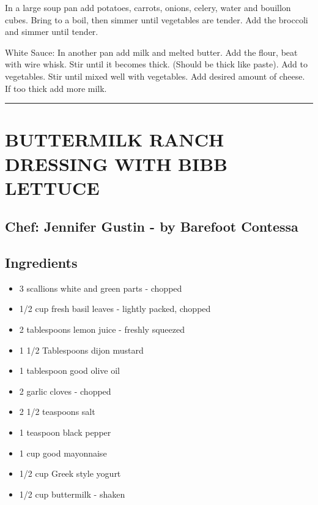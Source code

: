 \documentclass[
]{book}
\providecommand{\tightlist}{%
  \setlength{\itemsep}{0pt}\setlength{\parskip}{0pt}}
\begin{document}
In a large soup pan add potatoes, carrots, onions, celery, water and bouillon cubes.
Bring to a boil, then simmer until vegetables are tender. Add the broccoli and simmer until tender.

White Sauce:
In another pan add milk and melted butter. Add the flour, beat with wire whisk.
Stir until it becomes thick. (Should be thick like paste). Add to vegetables.
Stir until mixed well with vegetables.
Add desired amount of cheese. If too thick add more milk.

\begin{center}\rule{0.5\linewidth}{0.5pt}\end{center}

\hypertarget{buttermilk-ranch-dressing-with-bibb-lettuce}{%
\section*{BUTTERMILK RANCH DRESSING WITH BIBB LETTUCE}\label{buttermilk-ranch-dressing-with-bibb-lettuce}}


\hypertarget{chef-jennifer-gustin---by-barefoot-contessa}{%
\subsection*{Chef: Jennifer Gustin - by Barefoot Contessa}\label{chef-jennifer-gustin---by-barefoot-contessa}}


\hypertarget{ingredients-16}{%
\subsection*{Ingredients}\label{ingredients-16}}


\begin{itemize}
\tightlist
\item
  3 scallions white and green parts - chopped
\item
  1/2 cup fresh basil leaves - lightly packed, chopped
\item
  2 tablespoons lemon juice - freshly squeezed
\item
  1 1/2 Tablespoons dijon mustard
\item
  1 tablespoon good olive oil
\item
  2 garlic cloves - chopped
\item
  2 1/2 teaspoons salt
\item
  1 teaspoon black pepper
\item
  1 cup good mayonnaise
\item
  1/2 cup Greek style yogurt
\item
  1/2 cup buttermilk - shaken
\end{itemize}
\end{document}
